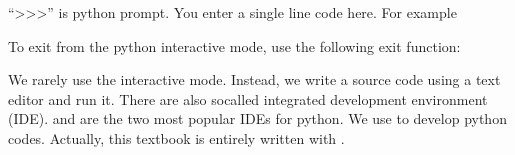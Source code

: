 \documentclass[letterpaper,10pt,english]{jupyterBook}
\begin{document}
\begin{sphinxVerbatim}[commandchars=\\\{\}]
        \PYG{p}{[}    \PYG{p}{]}     
        
\end{sphinxVerbatim}

\sphinxAtStartPar
“>>>” is python prompt.  You enter a single line code here.  For example

\begin{sphinxVerbatim}[commandchars=\\\{\}]
\end{sphinxVerbatim}

\sphinxAtStartPar
To exit from the python interactive mode, use the following exit function:

\begin{sphinxVerbatim}[commandchars=\\\{\}]
\end{sphinxVerbatim}

\sphinxAtStartPar
We rarely use the interactive mode. Instead, we write a source code using a text editor and run it.  There are also so\sphinxhyphen{}called integrated development environment (IDE).  and  are the two most popular IDEs for python.  We use to develop python codes.  Actually, this textbook is entirely written with .
\end{document}
